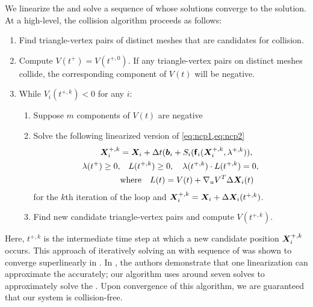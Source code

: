 We linearize the \ncp
and solve a sequence of \lcps whose solutions converge
to the \ncp solution.
At a high-level, the collision algorithm proceeds as follows:
\begin{enumerate}
    \item\label{step:near_tri_pair} Find triangle-vertex pairs of distinct meshes that are candidates for collision.
    \item Compute $V(t^+) = V(t^{+,0})$. If any triangle-vertex pairs on distinct meshes collide, the corresponding component of $V(t)$ will be negative.
    \item While $V_i(t^{+,k}) < 0$ for any $i$:
    \begin{enumerate}
        \item Suppose $m$ components of $V(t)$ are negative 
        \item \label{step:lcp_solve} Solve the following linearized version of \cref{eq:ncp1,eq:ncp2}
    \begin{align}
      {\bm{X}}^{+,k}_i &= {\bm{X}}_i + \Delta t (\bm{b}_i + S_i(\bm{\mathsf{f}}_i({\bm{X}}_i^{+,k},\lambda^{+,k})),\label{eq:ncp1}\\
      \lambda(t^+) \geq 0, &\quad  L(t^{+,k})\geq 0,
      \quad \lambda(t^{+,k}) \cdot L(t^{+,k}) 
      = 0,\label{eq:ncp2}\\
      &\text{where}\quad L(t) = V(t) + \nabla_u V^T \Delta {\bm{X}}_i(t)
    \end{align}%
    for the $k$th iteration of the loop and ${\bm{X}}^{+,k}_i = {\bm{X}}_i +
    \Delta{\bm{X}}_i(t^{+,k})$. 
  \item Find new candidate triangle-vertex pairs and compute $V(t^{+,k})$.
    \end{enumerate} 
\end{enumerate}
Here, $t^{+,k}$ is the intermediate time step at which a new candidate position ${\bm{X}}_i^{+,k}$ occurs.
This approach of iteratively solving an \ncp with sequence of \lcps was shown to converge superlinearly in \cite{fang1984linearization}. 
In \cite{yan2019computing}, the authors demonstrate that one \lcp linearization can approximate the \ncp accurately; our algorithm uses around seven \lcp solves to approximately solve the \ncp.
Upon convergence of this algorithm, we are guaranteed that our system is collision-free.

